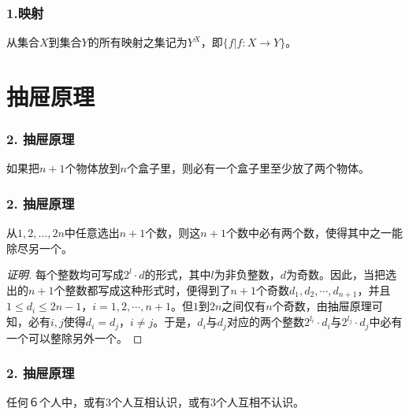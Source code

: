 \documentclass{beamer}
\begin{document}
\begin{CJK*}{UTF8}{gbsn}
\begin{frame}
\end{frame}
\begin{frame}
  \frametitle{1.映射}
  \begin{Def}
    从集合$X$到集合$Y$的所有映射之集记为$Y^X$，即$\{f|f:X\to Y\}$。
  \end{Def}
\end{frame}
\section{抽屉原理}
\begin{frame}
  \frametitle{2. 抽屉原理}
  \begin{Thm}[抽屉原理]
    如果把$n+1$个物体放到$n$个盒子里，则必有一个盒子里至少放了两个物体。
  \end{Thm}
  
\end{frame}

\begin{frame}
    \frametitle{2. 抽屉原理}
  \begin{Ex}
    从$1,2,\ldots, 2n$中任意选出$n+1$个数，则这$n+1$个数中必有两个数，使得其中之一能除尽另一个。
  \end{Ex}
  \pause
  \begin{proof}[证明]\justifying\let\raggedright\justifying
  每个整数均可写成$2^l\cdot d$的形式，其中$l$为非负整数，$d$为奇数。因此，当把选出的$n+1$个整数都写成这种形式时，便得到了$n+1$个奇数$d_1,d_2,\cdots, d_{n+1}$，并且$1\leq d_i \leq 2n -1$，$i=1,2,\cdots, n+1$。但$1$到$2n$之间仅有$n$个奇数，由抽屉原理可知，必有$i,j$使得$d_i=d_j$，$i\neq j$。于是，$d_i$与$d_j$对应的两个整数$2^{l_i}\cdot {d_i}$与$2^{l_j}\cdot {d_j}$中必有一个可以整除另外一个。
  \end{proof}
\end{frame}

\begin{frame}
    \frametitle{2. 抽屉原理}
  \begin{Ex}
    任何６个人中，或有$3$个人互相认识，或有$3$个人互相不认识。
  \end{Ex}
  
\end{frame}



\end{CJK*}
\end{document}
